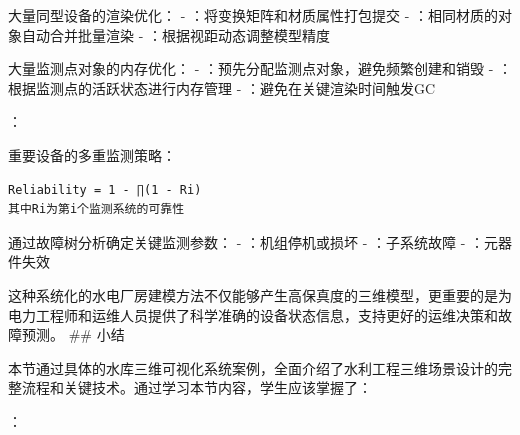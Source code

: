 
大量同型设备的渲染优化： - ：将变换矩阵和材质属性打包提交 - ：相同材质的对象自动合并批量渲染 - ：根据视距动态调整模型精度


大量监测点对象的内存优化： - ：预先分配监测点对象，避免频繁创建和销毁 - ：根据监测点的活跃状态进行内存管理 - ：避免在关键渲染时间触发GC

：


重要设备的多重监测策略：

\begin{lstlisting}
Reliability = 1 - ∏(1 - Ri)
其中Ri为第i个监测系统的可靠性
\end{lstlisting}


通过故障树分析确定关键监测参数： - ：机组停机或损坏 - ：子系统故障 - ：元器件失效

这种系统化的水电厂房建模方法不仅能够产生高保真度的三维模型，更重要的是为电力工程师和运维人员提供了科学准确的设备状态信息，支持更好的运维决策和故障预测。 \#\# 小结

本节通过具体的水库三维可视化系统案例，全面介绍了水利工程三维场景设计的完整流程和关键技术。通过学习本节内容，学生应该掌握了：

：

